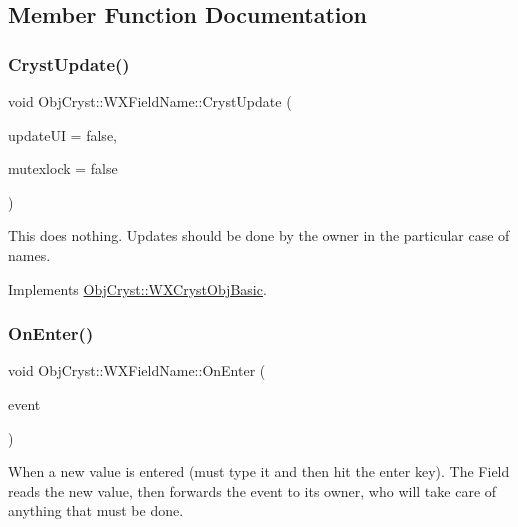 \subsection{Member Function Documentation}
\mbox{\label{class_obj_cryst_1_1_w_x_field_name_a0c01579606255f9c6d9e6738df89ba3b}} 
\subsubsection{\texorpdfstring{CrystUpdate()}{CrystUpdate()}}
{\footnotesize\ttfamily void Obj\+Cryst\+::\+W\+X\+Field\+Name\+::\+Cryst\+Update (\begin{DoxyParamCaption}\item[{const bool}]{update\+UI = {\ttfamily false},  }\item[{const bool}]{mutexlock = {\ttfamily false} }\end{DoxyParamCaption})\hspace{0.3cm}{\ttfamily [virtual]}}

This does nothing. Updates should be done by the owner in the particular case of names. 

Implements \mbox{\hyperlink{class_obj_cryst_1_1_w_x_cryst_obj_basic_a7ac00ae2ae28f1a6fa26e6fa571186b6}{Obj\+Cryst\+::\+W\+X\+Cryst\+Obj\+Basic}}.

\mbox{\label{class_obj_cryst_1_1_w_x_field_name_aedb19a5c1028d7956a42ccc3b6864481}} 
\subsubsection{\texorpdfstring{OnEnter()}{OnEnter()}}
{\footnotesize\ttfamily void Obj\+Cryst\+::\+W\+X\+Field\+Name\+::\+On\+Enter (\begin{DoxyParamCaption}\item[{wx\+Command\+Event \&}]{event }\end{DoxyParamCaption})}

When a new value is entered (must type it and then hit the \textquotesingle{}enter\textquotesingle{} key). The Field reads the new value, then forwards the event to its owner, who will take care of anything that must be done. \mbox{\label{class_obj_cryst_1_1_w_x_field_name_a59ce32e9b9860b6cc6a0833f9d96b753}} 
